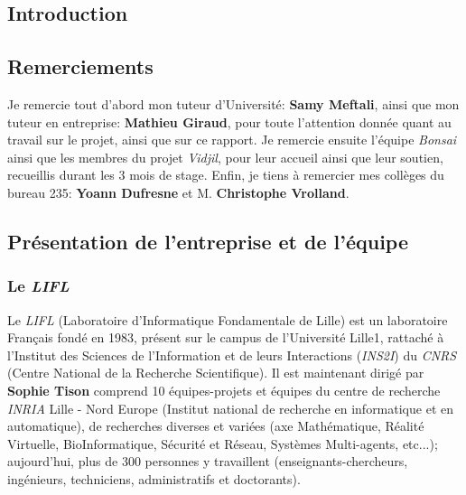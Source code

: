 \documentclass[pdftex,12pt,a4paper]{report}
\begin{document}
\begin{spacing}{1.2}



\tableofcontents

\chapter*{Introduction}


\section{Remerciements}
Je remercie tout d'abord mon tuteur d'Université: \textbf{Samy Meftali}, ainsi que mon tuteur en entreprise: \textbf{Mathieu Giraud}, pour toute l'attention donnée quant au travail sur le projet, ainsi que sur ce rapport.
\newline
Je remercie ensuite l'équipe \textit{Bonsai} ainsi que les membres du projet \textit{Vidjil}, pour leur accueil ainsi que leur soutien, recueillis durant les 3 mois de stage.
\newline
Enfin, je tiens à remercier mes collèges du bureau 235: \textbf{Yoann Dufresne} et M. \textbf{Christophe Vrolland}.

\section{Présentation de l'entreprise et de l'équipe}

\subsection{Le \textit{LIFL}}
Le \textit{LIFL} (Laboratoire d'Informatique Fondamentale de Lille) est un laboratoire Français fondé en 1983, présent sur le campus de l'Université Lille1, rattaché à l'Institut des Sciences de l'Information et de leurs Interactions (\textit{INS2I}) du \textit{CNRS} (Centre National de la Recherche Scientifique).
\newline
Il est maintenant dirigé par \textbf{Sophie Tison} comprend 10 équipes-projets et équipes du centre de recherche \textit{INRIA} Lille - Nord Europe (Institut national de recherche en informatique et en automatique), de recherches diverses et variées (axe Mathématique, Réalité Virtuelle, BioInformatique, Sécurité et Réseau, Systèmes Multi-agents, etc...); aujourd'hui, plus de 300 personnes y travaillent (enseignants-chercheurs, ingénieurs, techniciens, administratifs et doctorants).


\end{spacing}
\end{document}
